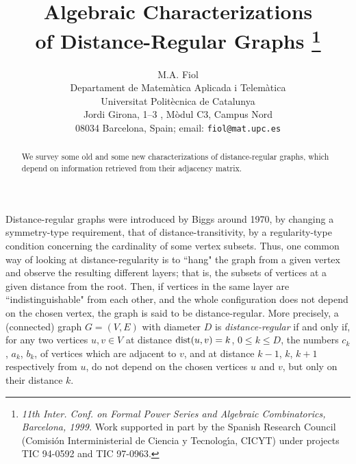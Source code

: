 \documentclass[11pt]{article}
\def\dist{\mathop{\rm dist}\nolimits}
\begin{document}
\title{Algebraic Characterizations  \\  
of  Distance-Regular Graphs
\thanks{ 
{\it 11th Inter. Conf. on Formal Power Series and Algebraic
Combinatorics, Barcelona, 1999.} 
\newline
 Work supported in part by the Spanish Research Council
(Comisi\'on Interministerial de Ciencia y Tecnolog\'\i a, CICYT)
     under projects  TIC 94-0592 and TIC 97-0963. 
}}     
\author{M.A. Fiol 
\\ {\small Departament de Matem\`atica Aplicada i Telem\`atica} \\
{\small Universitat Polit\`ecnica de Catalunya} \\ {\small Jordi
Girona, 1--3 , M\`odul C3, Campus Nord }\\ {\small 08034 Barcelona,
Spain; email: {\tt fiol@mat.upc.es}}   }
\date{}
\maketitle

\begin{abstract}
We survey some old and some new characterizations of
distance-regular graphs, which depend on information retrieved
from their adjacency matrix. 
\end{abstract}
Distance-regular graphs were introduced by Biggs around 1970,  by
changing a symme\-try-type requirement, that of
distance-transitivity, by a regularity-type condition concerning the
cardinality of some vertex subsets. Thus, one  common
way of looking at distance-regularity is to ``hang" the graph from
a given vertex and  observe the resulting different layers;
that is, the subsets of vertices at a given distance from the root.
Then, if vertices in the same layer are ``indistinguishable" from
each other, and the whole configuration does not depend on  the
chosen vertex, the graph is said to be distance-regular.  More
precisely, a (connected) graph
$G=(V,E)$ with diameter $D$ is {\it distance-regular} if and only if,
for any two vertices $u,v\in V$ at distance
$\dist(u,v)=k$, $0\le k\le D$, the numbers $c_k$, $a_k$, $b_k$, of
vertices which are adjacent to
$v$, and at distance $k-1$, $k$, $k+1$ respectively  from $u$, do 
not depend on the chosen vertices $u$ and $v$, but only on their
distance $k$.
\end{document}
